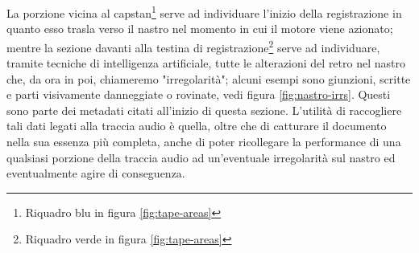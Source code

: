 La porzione vicina al capstan\footnote{Riquadro blu in figura \ref{fig:tape-areas}} serve ad individuare l'inizio della registrazione in quanto esso trasla verso il nastro nel momento in cui il motore viene azionato; mentre la sezione davanti alla testina di registrazione\footnote{Riquadro verde in figura \ref{fig:tape-areas}} serve ad individuare, tramite tecniche di intelligenza artificiale, tutte le alterazioni del retro nel nastro che, da ora in poi, chiameremo "irregolarità"; alcuni esempi sono giunzioni, scritte e parti visivamente danneggiate o rovinate, vedi figura \ref{fig:nastro-irrs}.
Questi sono parte dei metadati citati all'inizio di questa sezione.
L'utilità di raccogliere tali dati legati alla traccia audio è quella, oltre che di catturare il documento nella sua essenza più completa, anche di poter ricollegare la performance di una qualsiasi porzione della traccia audio ad un'eventuale irregolarità sul nastro ed eventualmente agire di conseguenza.

